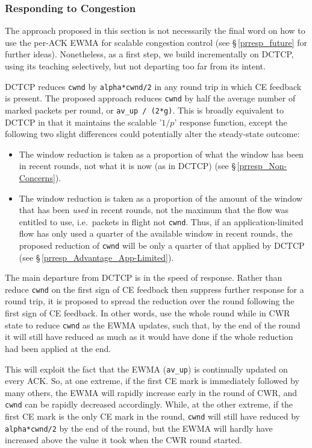 \subsubsection{Responding to Congestion}\label{prresp_congestion_response}

The approach proposed in this section is not necessarily the final word on how to use the per-ACK EWMA for scalable congestion control (see \S\,\ref{prresp_future} for further ideas). Nonetheless, as a first step, we build incrementally on DCTCP, using its teaching selectively, but not departing too far from its intent. 

DCTCP reduces \texttt{cwnd} by \texttt{alpha*cwnd/2} in any round trip in which CE feedback is present. The proposed approach reduces \texttt{cwnd} by half the average number of marked packets per round, or \texttt{av\_up / (2*g)}. This is broadly equivalent to DCTCP in that it maintains the scalable '\(1/p\)' response function, except the following two slight differences could potentially alter the steady-state outcome:
\begin{itemize}[nosep]
	\item The window reduction is taken as a proportion of what the window has been in recent rounds, not what it is now (as in DCTCP) (see \S\,\ref{prresp_Non-Concerns}).
	\item The window reduction is taken as a proportion of the amount of the window that has been \emph{used} in recent rounds, not the maximum that the flow was entitled to use, i.e.\ packets in flight not \texttt{cwnd}. Thus, if an application-limited flow has only used a quarter of the available window in recent rounds, the proposed reduction of \texttt{cwnd} will be only a quarter of that applied by DCTCP (see \S\,\ref{prresp_Advantage_App-Limited}).
\end{itemize}

The main departure from DCTCP is in the speed of response. Rather than reduce  \texttt{cwnd} on the first sign of CE feedback then suppress further response for a round trip, it is proposed to spread the reduction over the round following the first sign of CE feedback. In other words, use the whole round while in CWR state to reduce \texttt{cwnd} as the EWMA updates, such that, by the end of the round it will still have reduced as much as it would have done if the whole reduction had been applied at the end. 

This will exploit the fact that the EWMA (\texttt{av\_up}) is continually updated on every ACK. So, at one extreme, if the first CE mark is immediately followed by many others, the EWMA will rapidly increase early in the round of CWR, and \texttt{cwnd} can be rapidly decreased accordingly. While, at the other extreme, if the first CE mark is the only CE mark in the round, \texttt{cwnd} will still have reduced by \texttt{alpha*cwnd/2} by the end of the round, but the EWMA will hardly have increased above the value it took when the CWR round started. 

